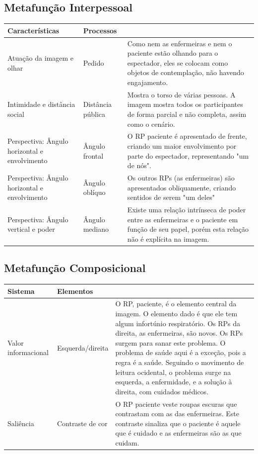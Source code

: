 \documentclass[aspectratio=169]{article}
\begin{document}
\subsection{Metafunção Interpessoal}

\begin{table}[H]
\begin{tabular}{p{} p{} p{}} \hline
Características & Processos \\ \hline \hline
Atuação da imagem e olhar & Pedido & Como nem as enfermeiras e nem o paciente estão olhando para o espectador, eles se colocam como objetos de contemplação, não havendo engajamento.\\ \hline
Intimidade e distância social & Distância pública & Mostra o torso de várias pessoas. A imagem mostra todos os participantes de forma parcial e não completa, assim como o cenário. \\ \hline
Perspectiva: Ângulo horizontal e envolvimento & Ângulo frontal & O RP paciente é apresentado de frente, criando um maior envolvimento por parte do espectador, representando "um de nós". \\ \hline
Perspectiva: Ângulo horizontal e envolvimento & Ângulo oblíquo & Os outros RPs (as enfermeiras) são apresentados obliquamente, criando sentidos de serem "um deles" \\ \hline
Perspectiva: Ângulo vertical e poder &  Ângulo mediano & Existe uma relação intrínseca de poder entre as enfermeiras e o paciente em função de seu papel, porém esta relação não é explícita na imagem. \\ \hline
\end{tabular}
\end{table}

\subsection{Metafunção Composicional}

\begin{table}[H]
\begin{tabular}{p{} p{} p{}} \hline
Sistema & Elementos \\ \hline \hline
Valor informacional & Esquerda/direita & O RP, paciente, é o elemento central da imagem. O elemento dado é que ele tem algum infortúnio respiratório. Os RPs da direita, as enfermeiras, são novos. Os RPs surgem para sanar este problema. O problema de saúde aqui é a exceção, pois a regra é a saúde. Seguindo o movimento de leitura ocidental, o problema surge na esquerda, a enfermidade, e a solução à direita, com cuidados médicos. \\ \hline
Saliência & Contraste de cor & O RP paciente veste roupas escuras que contrastam com as das enfermeiras. Este contraste sinaliza que o paciente é aquele que é cuidado e as enfermeiras são as que cuidam. \\ \hline
\end{tabular}
\end{table}
\end{document}
